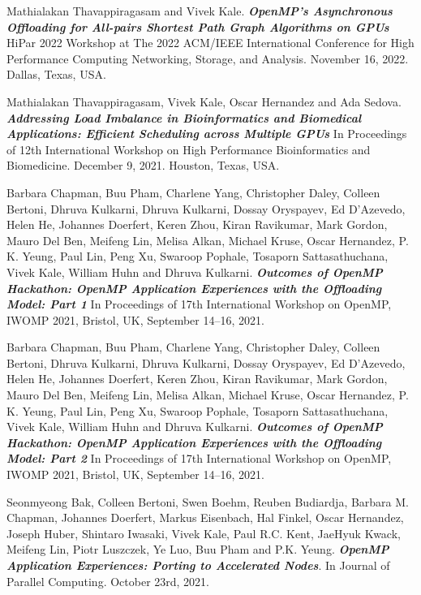 {\item Mathialakan Thavappiragasam and Vivek Kale. \textbf{\textit{OpenMP’s Asynchronous Offloading for All-pairs Shortest Path Graph Algorithms on GPUs}}  HiPar 2022 Workshop at The 2022 ACM/IEEE International Conference for High Performance Computing Networking, Storage, and Analysis. November 16, 2022. Dallas, Texas, USA. 

\item Mathialakan Thavappiragasam, Vivek Kale, Oscar Hernandez and  Ada Sedova. \textbf{\textit{Addressing Load Imbalance in Bioinformatics and Biomedical Applications: Efficient Scheduling across Multiple GPUs}} In Proceedings of 12th International Workshop on High Performance Bioinformatics and Biomedicine. December 9, 2021. Houston, Texas, USA. 

\item Barbara Chapman, Buu Pham, Charlene Yang, Christopher Daley, Colleen Bertoni, Dhruva Kulkarni, Dhruva Kulkarni, Dossay Oryspayev, Ed D’Azevedo, Helen He, Johannes Doerfert, Keren Zhou, Kiran Ravikumar, Mark Gordon, Mauro Del Ben, Meifeng Lin, Melisa Alkan, Michael Kruse, Oscar Hernandez, P. K. Yeung, Paul Lin, Peng Xu, Swaroop Pophale, Tosaporn Sattasathuchana, Vivek Kale, William Huhn and Dhruva Kulkarni. \textbf{\textit{Outcomes of OpenMP Hackathon: OpenMP Application Experiences with the Offloading Model: Part 1}} In Proceedings of 17th International Workshop on OpenMP, IWOMP 2021, Bristol, UK, September 14–16, 2021. 

\item Barbara Chapman, Buu Pham, Charlene Yang, Christopher Daley, Colleen Bertoni, Dhruva Kulkarni, Dhruva Kulkarni, Dossay Oryspayev, Ed D’Azevedo, Helen He, Johannes Doerfert, Keren Zhou, Kiran Ravikumar, Mark Gordon, Mauro Del Ben, Meifeng Lin, Melisa Alkan, Michael Kruse, Oscar Hernandez, P. K. Yeung, Paul Lin, Peng Xu, Swaroop Pophale, Tosaporn Sattasathuchana, Vivek Kale, William Huhn and Dhruva Kulkarni. \textbf{\textit{Outcomes of OpenMP Hackathon: OpenMP Application Experiences with the Offloading Model: Part 2}} In Proceedings of 17th International Workshop on OpenMP, IWOMP 2021, Bristol, UK, September 14–16, 2021. 

\item Seonmyeong Bak, Colleen Bertoni, Swen Boehm, Reuben Budiardja, Barbara M. Chapman, Johannes Doerfert, Markus Eisenbach, Hal Finkel, Oscar Hernandez, Joseph Huber, Shintaro Iwasaki, Vivek Kale, Paul R.C. Kent, JaeHyuk Kwack, Meifeng Lin, Piotr Luszczek, Ye Luo, Buu Pham and P.K. Yeung. \textbf{\textit{OpenMP Application Experiences: Porting to Accelerated Nodes}}.  In Journal of Parallel Computing. October 23rd, 2021.

}
